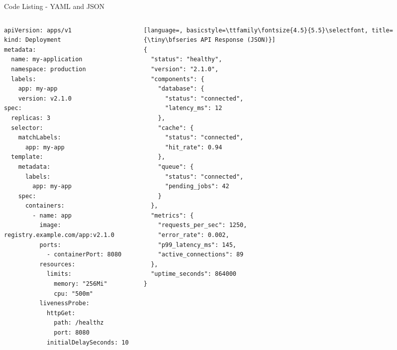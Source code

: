 \begin{frame}[fragile]{Code Listing - YAML and JSON}
  \begin{columns}[T]
    \begin{column}{0.50\textwidth}
      \begin{lstlisting}[style=yamlstyle, basicstyle=\ttfamily\fontsize{4.5}{5.5}\selectfont, title={\tiny\bfseries Kubernetes Deployment (YAML)}]
apiVersion: apps/v1
kind: Deployment
metadata:
  name: my-application
  namespace: production
  labels:
    app: my-app
    version: v2.1.0
spec:
  replicas: 3
  selector:
    matchLabels:
      app: my-app
  template:
    metadata:
      labels:
        app: my-app
    spec:
      containers:
        - name: app
          image: registry.example.com/app:v2.1.0
          ports:
            - containerPort: 8080
          resources:
            limits:
              memory: "256Mi"
              cpu: "500m"
          livenessProbe:
            httpGet:
              path: /healthz
              port: 8080
            initialDelaySeconds: 10
      \end{lstlisting}
    \end{column}
    \begin{column}{0.50\textwidth}
      \begin{lstlisting}[language=, basicstyle=\ttfamily\fontsize{4.5}{5.5}\selectfont, title={\tiny\bfseries API Response (JSON)}]
{
  "status": "healthy",
  "version": "2.1.0",
  "components": {
    "database": {
      "status": "connected",
      "latency_ms": 12
    },
    "cache": {
      "status": "connected",
      "hit_rate": 0.94
    },
    "queue": {
      "status": "connected",
      "pending_jobs": 42
    }
  },
  "metrics": {
    "requests_per_sec": 1250,
    "error_rate": 0.002,
    "p99_latency_ms": 145,
    "active_connections": 89
  },
  "uptime_seconds": 864000
}
      \end{lstlisting}
    \end{column}
  \end{columns}
\end{frame}

